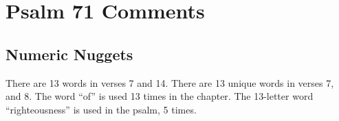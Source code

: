 \section{Psalm 71 Comments}

\subsection{Numeric Nuggets}
There are 13 words in verses 7 and 14. There are 13 unique words in verses 7,  and 8. The word ``of'' is used 13 times in the chapter.  The 13-letter word ``righteousness'' is used in the psalm, 5 times.